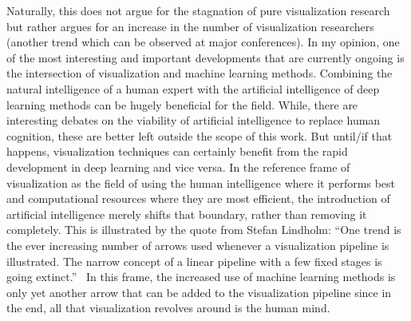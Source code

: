 Naturally, this does not argue for the stagnation of pure visualization research but rather argues for an increase in the number of visualization researchers (another trend which can be observed at major conferences).  In my opinion, one of the most interesting and important developments that are currently ongoing is the intersection of visualization and machine learning methods.  Combining the natural intelligence of a human expert with the artificial intelligence of deep learning methods can be hugely beneficial for the field.  While, there are interesting debates on the viability of artificial intelligence to replace human cognition, these are better left outside the scope of this work.  But until/if that happens, visualization techniques can certainly benefit from the rapid development in deep learning and vice versa.  In the reference frame of visualization as the field of using the human intelligence where it performs best and computational resources where they are most efficient, the introduction of artificial intelligence merely shifts that boundary, rather than removing it completely.  This is illustrated by the quote from Stefan Lindholm: ``One trend is the ever increasing number of arrows used whenever a visualization pipeline is illustrated. The narrow concept of a linear pipeline with a few fixed stages is going extinct.''~\cite{lindholm14medical}  In this frame, the increased use of machine learning methods is only yet another arrow that can be added to the visualization pipeline since in the end, all that visualization revolves around is the human mind.








